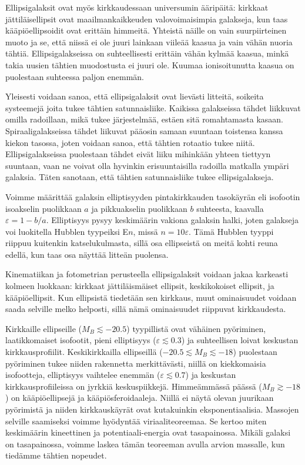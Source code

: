 \documentclass[12pt,a4paper]{article}
\begin{document}
Ellipsigalaksit ovat myös kirkkaudessaan universumin ääripäitä: kirkkaat jättiläisellipsit ovat maailmankaikkeuden valovoimaisimpia galakseja, kun taas kääpiöellipsoidit ovat erittäin himmeitä. Yhteistä näille on vain suurpiirteinen muoto ja se, että niissä ei ole juuri lainkaan viileää kaasua ja vain vähän nuoria tähtiä. Ellipsigalakseissa on suhteellisesti erittäin vähän kylmää kaasua, minkä takia uusien tähtien muodostusta ei juuri ole. Kuumaa ionisoitunutta kaasua on puolestaan suhteessa paljon enemmän.

Yleisesti voidaan sanoa, että ellipsigalaksit ovat lievästi litteitä, soikeita systeemejä joita tukee tähtien satunnaisliike. Kaikissa galakseissa tähdet liikkuvat omilla radoillaan, mikä tukee järjestelmää, estäen sitä romahtamasta kasaan. Spiraaligalakseissa tähdet liikuvat pääosin samaan suuntaan toistensa kanssa kiekon tasossa, joten voidaan sanoa, että tähtien rotaatio tukee niitä. Ellipsigalakseissa puolestaan tähdet eivät liiku mihinkään yhteen tiettyyn suuntaan, vaan ne voivat olla hyvinkin erisuuntaisilla radoilla matkalla ympäri galaksia. Täten sanotaan, että tähtien satunnaisliike tukee ellipsigalakseja.

Voimme määrittää galaksin elliptisyyden pintakirkkauden tasokäyrän eli isofootin isoakselin puolikkaan $a$ ja pikkuakselin puolikkaan $b$ suhteesta, kaavalla $\varepsilon = 1 - b/a$. Elliptisyys pysyy keskimäärin vakiona galaksin halki, joten galakseja voi luokitella Hubblen tyypeiksi E$n$, missä $n = 10\varepsilon$. Tämä Hubblen tyyppi riippuu kuitenkin katselukulmasta, sillä osa ellipseistä on meitä kohti reuna edellä, kun taas osa näyttää litteän puolensa.

Kinematiikan ja fotometrian perusteella ellipsigalaksit voidaan jakaa karkeasti kolmeen luokkaan: kirkkaat jättiläismäiset ellipsit, keskikokoiset ellipsit, ja kääpiöellipsit. Kun ellipsistä tiedetään sen kirkkaus, muut ominaisuudet voidaan saada selville melko helposti, sillä nämä ominaisuudet riippuvat kirkkaudesta.

Kirkkaille ellipseille ($M_B \lesssim -20.5$) tyypillistä ovat vähäinen pyöriminen, laatikkomaiset isofootit, pieni elliptisyys ($\varepsilon \lesssim 0.3$) ja suhteellisen loivat keskustan kirkkausprofiilit. Keskikirkkailla ellipseillä ($-20.5 \lesssim M_B \lesssim -18$) puolestaan pyöriminen tukee niiden rakennetta merkittävästi, niillä on kiekkomaisia isofootteja, elliptisyys vaihtelee enemmän ($\varepsilon \lesssim 0.7$) ja keskustan kirkkausprofiileissa on jyrkkiä keskuspiikkejä. Himmeämmässä päässä ($M_B \gtrsim -18$) on kääpiöellipsejä ja kääpiösferoidaaleja. Niillä ei näytä olevan juurikaan pyörimistä ja niiden kirkkauskäyrät ovat kutakuinkin eksponentiaalisia. Massojen selville saamiseksi voimme hyödyntää viriaaliteoreemaa. Se kertoo miten keskimäärin kineettinen ja potentiaali-energia ovat tasapainossa. Mikäli galaksi on tasapainossa, voimme laskea tämän teoreeman avulla arvion massalle, kun tiedämme tähtien nopeudet.
\end{document}

